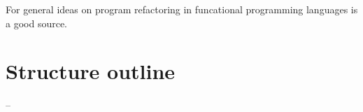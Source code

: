 For general ideas on program refactoring in funcational programming languages
\cite{HARE} is a good source.

\section{Structure outline}
\begin{description}
\item[ -- ]
\end{description}


